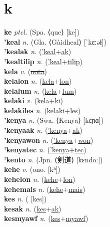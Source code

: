 \section{k}

\textbf{ke} \textit{ptcl.} (Spa. ⟨que⟩ [ke])
 \label{ke} \\
\textbf{'keal} \textit{n.} (Gla. ⟨Gàidheal⟩ [ˈkɛːəɫ])
 \label{'keal} \\
\textbf{'kealak} \textit{n.} (\hyperref['keal]{'keal}+\hyperref[ak]{ak})
 \label{'kealak} \\
\textbf{'kealtilip} \textit{n.} (\hyperref['keal]{'keal}+\hyperref[tilip]{tilip})
 \label{'kealtilip} \\
\textbf{kela} \textit{v.} (\hyperref[nota]{\sout{nota}})
 \label{kela} \\
\textbf{kelalon} \textit{n.} (\hyperref[kela]{kela}+\hyperref[lon]{lon})
 \label{kelalon} \\
\textbf{kelalum} \textit{n.} (\hyperref[kela]{kela}+\hyperref[lum]{lum})
 \label{kelalum} \\
\textbf{kelaki} \textit{v.} (\hyperref[kela]{kela}+\hyperref[ki]{ki})
 \label{kelaki} \\
\textbf{kelakiles} \textit{n.} (\hyperref[kelaki]{kelaki}+\hyperref[les]{les})
 \label{kelakiles} \\
\textbf{'kenya} \textit{n.} (Swa. ⟨Kenya⟩ [kɛɲɑ])
 \label{'kenya} \\
\textbf{'kenyaak} \textit{n.} (\hyperref['kenya]{'kenya}+\hyperref[ak]{ak})
 \label{'kenyaak} \\
\textbf{'kenyawon} \textit{n.} (\hyperref['kenya]{'kenya}+\hyperref[won]{won})
 \label{'kenyawon} \\
\textbf{'kenyatec} \textit{n.} (\hyperref['kenya]{'kenya}+\hyperref[tec]{tec})
 \label{'kenyatec} \\
\textbf{'kento} \textit{n.} (Jpn. ⟨剣道⟩ [kɛndoː])
 \label{'kento} \\
\textbf{kehe} \textit{v.} (ono. [kʰ])
 \label{kehe} \\
\textbf{kehelon} \textit{n.} (\hyperref[kehe]{kehe}+\hyperref[lon]{lon})
 \label{kehelon} \\
\textbf{kehemais} \textit{n.} (\hyperref[kehe]{kehe}+\hyperref[mais]{mais})
 \label{kehemais} \\
\textbf{kes} \textit{n.} ( [kes])
 \label{kes} \\
\textbf{kesak} \textit{n.} (\hyperref[kes]{kes}+\hyperref[ak]{ak})
 \label{kesak} \\
\textbf{kesmyawf} \textit{n.} (\hyperref[kes]{kes}+\hyperref[myawf]{myawf})
